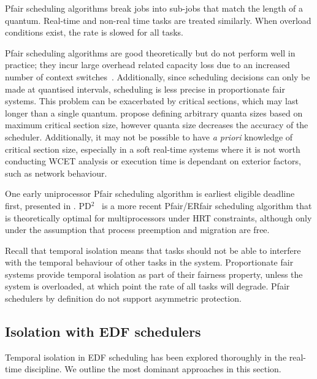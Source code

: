 Pfair scheduling algorithms break jobs into sub-jobs that match the length of a quantum.
Real-time and non-real time tasks are treated similarly.
When overload conditions exist, the rate is slowed for all tasks.

Pfair scheduling algorithms are good theoretically but do not perform well in practice; they incur
large overhead related capacity loss due to an increased number of context
switches~\citep{Abeni_Buttazzo_04}. Additionally, since
scheduling decisions can only be made at quantised intervals, scheduling is less precise in
proportionate fair systems.  This problem can be exacerbated by critical sections, which may last
longer than a single quantum.  \citet{Stoica_AKBGP_96} propose defining arbitrary quanta sizes based
on maximum critical section size, however quanta size decreases the accuracy of the scheduler.
Additionally, it may not be possible to have \emph{a priori} knowledge of critical section size, especially
in a soft real-time systems where it is not worth conducting \gls{WCET} analysis or execution time
is dependant on exterior factors, such as network behaviour.

One early uniprocessor Pfair scheduling algorithm is earliest eligible deadline first, presented in
\citet{Stoica_AKBGP_96}.  PD$^{2}$~\citep{Srinivasan_Anderson_06} is a more recent Pfair/ERfair
scheduling algorithm that is theoretically optimal for multiprocessors under \gls{HRT} constraints,
although only under the assumption that process preemption and migration are free.

Recall that temporal isolation means that tasks should not be able to interfere with the temporal
behaviour of other tasks in the system.  Proportionate fair systems provide temporal isolation as
part of their fairness property, unless the system is overloaded, at which point the rate of all
tasks will degrade. Pfair schedulers by definition do not support asymmetric protection.

\subsection{Isolation with EDF schedulers}

Temporal isolation in \gls{EDF} scheduling has been explored thoroughly in the real-time discipline.
We outline the most dominant approaches in this section.

